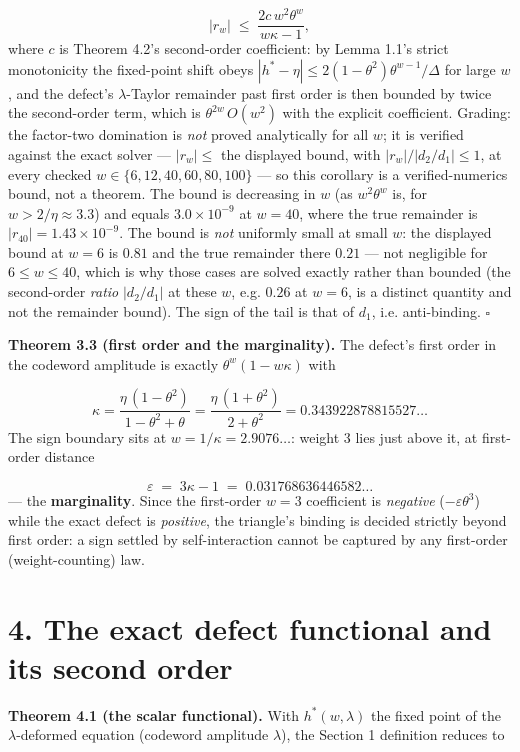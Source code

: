\documentclass[11pt]{article}
\begin{document}
\[
|r_w| \;\le\; \frac{2c\,w^2\theta^{w}}{w\kappa - 1},
\]
where $c$ is Theorem 4.2's second-order coefficient: by Lemma 1.1's strict monotonicity the fixed-point shift obeys $|h^* - \eta| \le 2(1-\theta^2)\theta^{w-1}/\Delta$ for large $w$, and the defect's $\lambda$-Taylor remainder past first order is then bounded by twice the second-order term, which is $\theta^{2w}\,O(w^2)$ with the explicit coefficient.  Grading: the factor-two domination is \emph{not} proved analytically for all $w$; it is verified against the exact solver — $|r_w| \le$ the displayed bound, with $|r_w|/|d_2/d_1| \le 1$, at every checked $w \in \{6, 12, 40, 60, 80, 100\}$ — so this corollary is a verified-numerics bound, not a theorem.  The bound is decreasing in $w$ (as $w^2\theta^w$ is, for $w > 2/\eta \approx 3.3$) and equals $3.0\times 10^{-9}$ at $w = 40$, where the true remainder is $|r_{40}| = 1.43\times 10^{-9}$.  The bound is \emph{not} uniformly small at small $w$: the displayed bound at $w = 6$ is $0.81$ and the true remainder there $0.21$ — not negligible for $6 \le w \le 40$, which is why those cases are solved exactly rather than bounded (the second-order \emph{ratio} $|d_2/d_1|$ at these $w$, e.g. $0.26$ at $w=6$, is a distinct quantity and not the remainder bound).  The sign of the tail is that of $d_1$, i.e. anti-binding.  $\square$

\textbf{Theorem 3.3 (first order and the marginality).}  The defect's first order in the codeword amplitude is exactly $\theta^w(1 - w\kappa)$ with

\[
\kappa = \frac{\eta\,(1-\theta^2)}{1-\theta^2+\theta}
= \frac{\eta\,(1+\theta^2)}{2+\theta^2}
= 0.343922878815527\ldots
\]
The sign boundary sits at $w = 1/\kappa = 2.9076\ldots$: weight 3 lies just above it, at first-order distance

\[
\varepsilon \;=\; 3\kappa - 1 \;=\; 0.031768636446582\ldots
\]
— the \textbf{marginality}.  Since the first-order $w = 3$ coefficient is \emph{negative} ($-\varepsilon\theta^3$) while the exact defect is \emph{positive}, the triangle's binding is decided strictly beyond first order: a sign settled by self-interaction cannot be captured by any first-order (weight-counting) law.

\section*{4. The exact defect functional and its second order}
\textbf{Theorem 4.1 (the scalar functional).}  With $h^*(w,\lambda)$ the fixed point of the $\lambda$-deformed equation (codeword amplitude $\lambda$), the Section 1 definition reduces to
\end{document}
